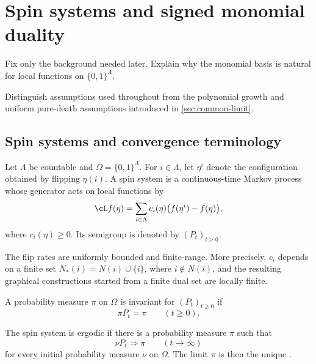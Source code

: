 \section{Spin systems and signed monomial duality}
\label{sec:monomial-duality}

\begin{discussion}
  \item Fix only the background needed later. Explain why the monomial
  basis is natural for local functions on \(\{0,1\}^{\Lambda}\).
  \item Distinguish assumptions used throughout from the polynomial
  growth and uniform pure-death assumptions introduced in
  \cref{sec:common-limit}.
\end{discussion}

\subsection{Spin systems and convergence terminology}

\begin{definition}
\label{def:spin-system}
Let \(\Lambda\) be countable and
\(\Omega=\{0,1\}^{\Lambda}\). For \(i\in\Lambda\), let \(\eta^i\)
denote the configuration obtained by flipping \(\eta(i)\). A spin
system is a continuous-time Markov process whose generator acts on
local functions by
\begin{equation}
  \cL f(\eta)
  =
  \sum_{i\in\Lambda}
  c_i(\eta)\bigl(f(\eta^i)-f(\eta)\bigr),
  \label{eq:spin-generator}
\end{equation}
where \(c_i(\eta)\ge0\). Its semigroup is denoted by
\((P_t)_{t\ge0}\).
\end{definition}

\begin{assumption}
\label{ass:standing-locality}
The flip rates are uniformly bounded and finite-range. More
precisely, \(c_i\) depends on a finite set
\(N_*(i)=N(i)\cup\{i\}\), where \(i\notin N(i)\), and the resulting
graphical constructions started from a finite dual set are locally
finite.
\end{assumption}

\begin{definition}
\label{def:invariant-measure}
A probability measure \(\pi\) on \(\Omega\) is invariant for
\((P_t)_{t\ge0}\) if
\[
  \pi P_t=\pi
  \qquad(t\ge0).
\]
\end{definition}

\begin{definition}[Ergodicity]
\label{def:ergodicity}
The spin system is ergodic if there is a probability measure \(\pi\)
such that
\[
  \nu P_t\Longrightarrow\pi
  \qquad(t\to\infty)
\]
for every initial probability measure \(\nu\) on \(\Omega\). The limit
\(\pi\) is then the unique \invariantmeasure.
\end{definition}

